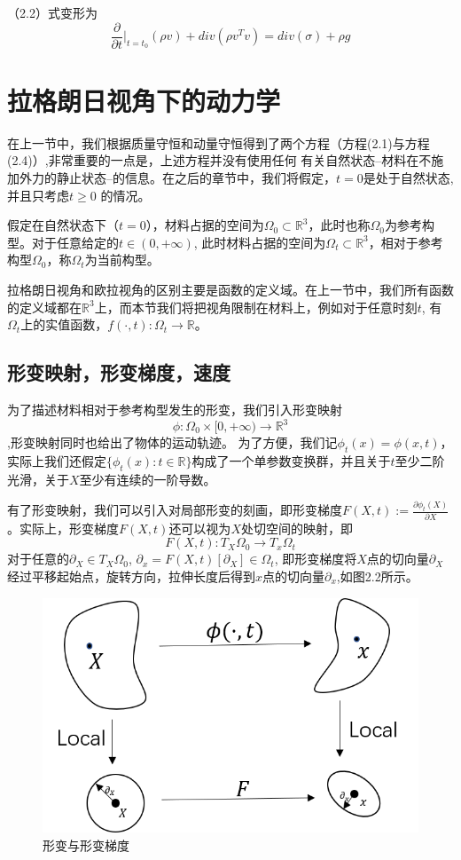（2.2）式变形为
\begin{equation}
    \frac{\partial}{\partial t} \Big |_{t = t_0}(\rho v) + div(\rho v^{T}v) = div(\sigma) + \rho g
\end{equation}


\section{拉格朗日视角下的动力学}
在上一节中，我们根据质量守恒和动量守恒得到了两个方程（方程(2.1)与方程(2.4)）,非常重要的一点是，上述方程并没有使用任何
有关自然状态--材料在不施加外力的静止状态--的信息。在之后的章节中，我们将假定，$t=0$是处于自然状态,并且只考虑$t \ge 0$ 的情况。

假定在自然状态下（$t = 0$），材料占据的空间为$\Omega_0 \subset \mathbb{R}^3$，此时也称$\Omega_0$为参考构型。对于任意给定的$t\in (0,+\infty)$,
此时材料占据的空间为$\Omega_t \subset \mathbb{R}^3$，相对于参考构型$\Omega_0$，称$\Omega_t$为当前构型。

拉格朗日视角和欧拉视角的区别主要是函数的定义域。在上一节中，我们所有函数的定义域都在$\mathbb{R}^3$上，而本节我们将把视角限制在材料上，例如对于任意时刻$t$,
有$\Omega_t$上的实值函数，$f(\cdot,t) :\Omega_t \rightarrow \mathbb{R} $。

\subsection{形变映射，形变梯度，速度}
为了描述材料相对于参考构型发生的形变，我们引入形变映射 $$\phi:\Omega_0 \times [0,+\infty) \rightarrow \mathbb{R}^3$$,形变映射同时也给出了物体的运动轨迹。
为了方便，我们记$\phi_t (x) = \phi(x,t)$，实际上我们还假定$\{ \phi_t(x): t\in \mathbb{R}\}$构成了一个单参数变换群，并且关于$t$至少二阶光滑，关于$X$至少有连续的一阶导数。

有了形变映射，我们可以引入对局部形变的刻画，即形变梯度$F(X,t):=\frac{\partial \phi_t(X)}{\partial X}$。实际上，形变梯度$F(X,t)$还可以视为$X$处切空间的映射，即
$$F(X,t):T_X \Omega_0 \rightarrow T_x \Omega_t$$
对于任意的$\partial_X \in T_X \Omega_0$, $\partial_x = F(X,t)[\partial_X] \in \Omega_t$,
即形变梯度将$X$点的切向量$\partial_X$经过平移起始点，旋转方向，拉伸长度后得到$x$点的切向量$\partial_x$,如图2.2所示。
\begin{figure}[htbp]
    \centering
    \includegraphics[scale=1.0]{./images/image2.png}
    \caption{形变与形变梯度}
    \label{fig:deformation gradient}
\end{figure}

